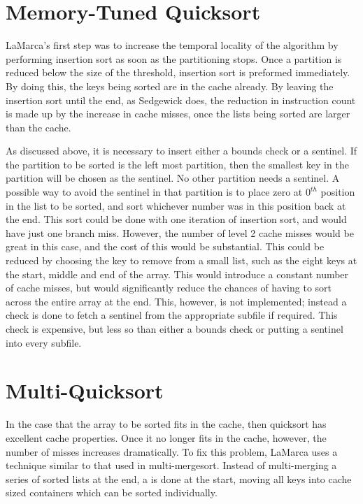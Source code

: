 \section{Memory-Tuned Quicksort}

LaMarca's first step was to increase the temporal locality of the algorithm by
performing insertion sort as soon as the partitioning stops. Once a partition is
reduced below the size of the threshold, insertion sort is preformed
immediately. By doing this, the keys being sorted are in the cache already. By
leaving the insertion sort until the end, as Sedgewick does, the reduction in
instruction count is made up by the increase in cache misses, once the
lists being sorted are larger than the cache. 

As discussed above, it is necessary to insert either a bounds check or a
sentinel.  If the partition to be sorted is the left most partition, then the
smallest key in the partition will be chosen as the sentinel. No other
partition needs a sentinel. A possible way to avoid the sentinel in that
partition is to place zero at $0^{th}$ position in the list to be sorted, and
sort whichever number was in this position back at the end. This sort could be
done with one iteration of insertion sort, and would have just one branch miss.
However, the number of level 2 cache misses would be great in this case,
and the cost of this would be substantial. This could be reduced by
choosing the key to remove from a small list, such as the eight keys at the
start, middle and end of the array. This would introduce a constant number of
cache misses, but would significantly reduce the chances of having to sort
across the entire array at the end. This, however, is not implemented; instead a
check is done to fetch a sentinel from the appropriate subfile if required. This
check is expensive, but less so than either a bounds check or putting a sentinel
into every subfile.

\section{Multi-Quicksort}

In the case that the array to be sorted fits in the cache, then quicksort has
excellent cache properties. Once it no longer fits in the cache, however, the
number of misses increases dramatically. To fix this problem, LaMarca uses a
technique similar to that used in multi-mergesort. Instead of multi-merging a
series of sorted lists at the end, a  is done at the start,
moving all keys into cache sized containers which can be sorted individually.

